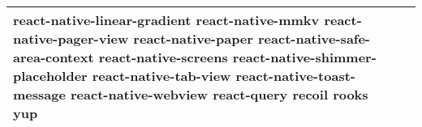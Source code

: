 \documentclass[conference, a4paper]{IEEEtran}
\begin{document}
\begin{table} [htp]
\begin{tabular}{p{1.7cm}|p{2.8cm}|p{2.5cm}}
react-native-linear-gradient \newline react-native-mmkv \newline react-native-pager-view \newline react-native-paper \newline react-native-safe-area-context \newline react-native-screens \newline react-native-shimmer-placeholder \newline react-native-tab-view \newline react-native-toast-message \newline react-native-webview \newline react-query \newline recoil \newline rooks \newline yup \\
 \hline
\end{tabular}
\end{table}
\end{document}
